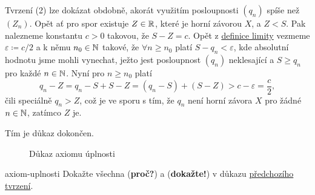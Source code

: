 \begin{propproof}
 Tvrzení (2) lze dokázat obdobně, akorát využitím posloupnosti $(q_n)$ spíše než
 $(Z_n)$. Opět ať pro spor existuje $Z \in \mathbb{R}$, které je horní závorou $X$, a $Z
 < S$. Pak nalezneme konstantu $c > 0$ takovou, že $S - Z = c$. Opět z
 \hyperref[def:limita-posloupnosti]{definice limity} vezmeme $\varepsilon
 \coloneqq c / 2$ a k němu $n_0 \in \mathbb{N}$ takové, že $\forall n \geq n_0$ platí $S
 - q_n < \varepsilon$, kde absolutní hodnotu jsme mohli vynechat, ježto jest
 posloupnost $(q_n)$ neklesající a $S \geq q_n$ pro každé $n \in \mathbb{N}$. Nyní pro
 $n \geq n_0$ platí
 \[
  q_n - Z = q_n - S + S - Z = (q_n - S) + (S - Z) > c - \varepsilon =
  \frac{c}{2},
 \]
 čili speciálně $q_n > Z$, což je ve sporu s tím, že $q_n$ není horní závora $X$
 pro žádné $n \in \mathbb{N}$, zatímco $Z$ je.

 Tím je důkaz dokončen.
\end{propproof}
\begin{figure}[ht]
 \centering
 \begin{subfigure}[b]{.99\textwidth}
  \centering
 \end{subfigure}
 \begin{subfigure}[b]{.99\textwidth}
  \centering
 \end{subfigure}
 \caption{Důkaz axiomu úplnosti}
 \label{fig:axiom-uplnosti}
\end{figure}
\begin{exercise}{}{axiom-uplnosti}
 Dokažte všechna (\textbf{proč?}) a (\textbf{dokažte!}) v důkazu
 \hyperref[prop:axiom-uplnosti]{předchozího tvrzení}.
\end{exercise}

